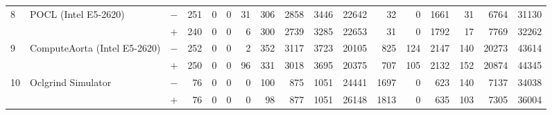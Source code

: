 \begin{tabular}{lll | rrrrrrr | rrrrrrr }
\hline
\multirow{ 2}{*}{8} & \multirow{ 2}{*}{POCL (Intel E5-2620)} & $-$ & 251 & 0 & 0 & 31 & 306 & 2858 & 3446       & 22642 & 32 & 0 & 1661 & 31 & 6764 & 31130 \\& & $+$ & 240 & 0 & 0 & 6 & 300 & 2739 & 3285 & 22653 & 31 & 0 & 1792 & 17 & 7769 & 32262 \\
\hline
\multirow{ 2}{*}{9} & \multirow{ 2}{*}{ComputeAorta (Intel E5-2620)} & $-$ & 252 & 0 & 0 & 2 & 352 & 3117 & 3723       & 20105 & 825 & 124 & 2147 & 140 & 20273 & 43614 \\& & $+$ & 250 & 0 & 0 & 96 & 331 & 3018 & 3695 & 20375 & 707 & 105 & 2132 & 152 & 20874 & 44345 \\
\hline
\multirow{ 2}{*}{10} & \multirow{ 2}{*}{Oclgrind Simulator} & $-$ & 76 & 0 & 0 & 0 & 100 & 875 & 1051       & 24441 & 1697 & 0 & 623 & 140 & 7137 & 34038 \\& & $+$ & 76 & 0 & 0 & 0 & 98 & 877 & 1051 & 26148 & 1813 & 0 & 635 & 103 & 7305 & 36004 \\
  \bottomrule
\end{tabular}

